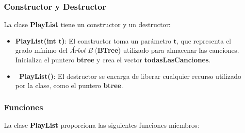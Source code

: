 \documentclass[12pt]{article}
\begin{document}
\begin{flushleft}
            \subsubsection{Constructor y Destructor}
            
                \noindent\hspace*{4em}La clase \textbf{PlayList} tiene un constructor y un destructor:
                
                \begin{itemize}[left=4em]
                    \item \textbf{PlayList(int t)}: El constructor toma un parámetro \textbf{t}, que representa el grado mínimo del \textit{Árbol B} (\textbf{BTree}) utilizado para almacenar las canciones. Inicializa el puntero \textbf{btree} y crea el vector \textbf{todasLasCanciones}.
                    \item \textbf{~PlayList()}: El destructor se encarga de liberar cualquier recurso utilizado por la clase, como el puntero \textbf{btree}.
                \end{itemize}
            
            \subsubsection{Funciones}
            
                \noindent\hspace*{4em}La clase \textbf{PlayList} proporciona las siguientes funciones miembros:
                

\end{flushleft}
\end{document}

